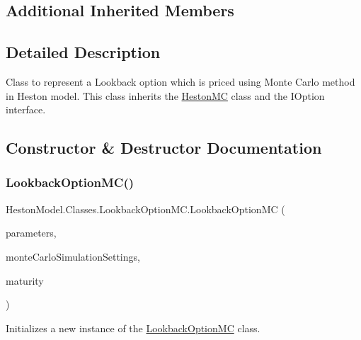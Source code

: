 \subsection*{Additional Inherited Members}


\subsection{Detailed Description}
Class to represent a Lookback option which is priced using Monte Carlo method in Heston model. This class inherits the \mbox{\hyperlink{class_heston_model_1_1_classes_1_1_heston_m_c}{Heston\+MC}} class and the I\+Option interface. 



\subsection{Constructor \& Destructor Documentation}
\mbox{\label{class_heston_model_1_1_classes_1_1_lookback_option_m_c_ab441b9a54c2eba0a01e3987cc6c9c489}} 
\subsubsection{\texorpdfstring{Lookback\+Option\+M\+C()}{LookbackOptionMC()}}
{\footnotesize\ttfamily Heston\+Model.\+Classes.\+Lookback\+Option\+M\+C.\+Lookback\+Option\+MC (\begin{DoxyParamCaption}\item[{\mbox{\hyperlink{class_heston_model_1_1_classes_1_1_interface_classes_1_1_heston_model_parameters}{Heston\+Model\+Parameters}}}]{parameters,  }\item[{\mbox{\hyperlink{class_heston_model_1_1_classes_1_1_interface_classes_1_1_monte_carlo_settings}{Monte\+Carlo\+Settings}}}]{monte\+Carlo\+Simulation\+Settings,  }\item[{double}]{maturity }\end{DoxyParamCaption})\hspace{0.3cm}{\ttfamily [inline]}}



Initializes a new instance of the \mbox{\hyperlink{class_heston_model_1_1_classes_1_1_lookback_option_m_c}{Lookback\+Option\+MC}} class. 


